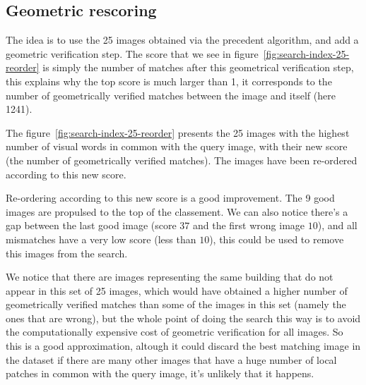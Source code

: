 \documentclass{article}
\begin{document}
\subsection{Geometric rescoring}



The idea is to use the 25 images obtained via the precedent algorithm,
and add a geometric verification step. The score that we see in
figure~\ref{fig:search-index-25-reorder} is simply the number of
matches after this geometrical verification step, this explains why
the top score is much larger than 1, it corresponds to the number of
geometrically verified matches between the image and itself (here
1241).





The figure~\ref{fig:search-index-25-reorder} presents the 25 images
with the highest number of visual words in common with the query
image, with their new score (the number of geometrically verified
matches). The images have been re-ordered according to this new score.

Re-ordering according to this new score is a good improvement. The 9
good images are propulsed to the top of the classement.  We can also
notice there's a gap between the last good image (score $37$ and the
first wrong image $10$), and all mismatches have a very low score (less
than $10$), this could be used to remove this images from the search.

We notice that there are images representing the same building that do
not appear in this set of 25 images, which would have obtained a higher
number of geometrically verified matches than some of the images in
this set (namely the ones that are wrong), but the whole point of doing
the search this way is to avoid the computationally expensive cost of
geometric verification for all images. So this is a good
approximation, altough it could discard the best matching image in the
dataset if there are many other images that have a huge number of
local patches in common with the query image, it's unlikely that it
happens.
\end{document}
